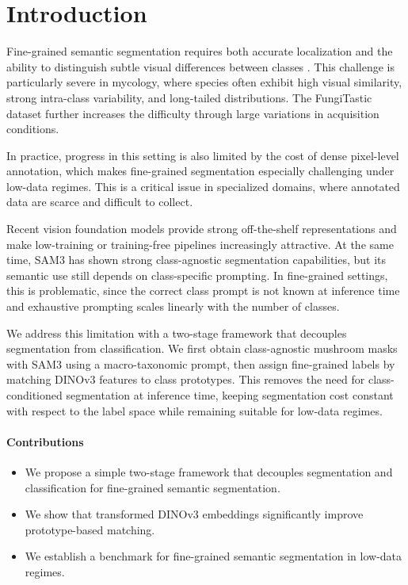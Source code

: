 \section{Introduction}

Fine-grained semantic segmentation requires both accurate localization and the ability to distinguish subtle visual differences between classes \cite{birdclef, plantclef}. This challenge is particularly severe in mycology, where species often exhibit high visual similarity, strong intra-class variability, and long-tailed distributions. The FungiTastic dataset \cite{Picek_2022_WACV} further increases the difficulty through large variations in acquisition conditions.

In practice, progress in this setting is also limited by the cost of dense pixel-level annotation, which makes fine-grained segmentation especially challenging under low-data regimes. This is a critical issue in specialized domains, where annotated data are scarce and difficult to collect.

Recent vision foundation models \cite{dinov2, clip, siglip} provide strong off-the-shelf representations and make low-training or training-free pipelines increasingly attractive. At the same time, SAM3 \cite{carion2025sam3segmentconcepts} has shown strong class-agnostic segmentation capabilities, but its semantic use still depends on class-specific prompting. In fine-grained settings, this is problematic, since the correct class prompt is not known at inference time and exhaustive prompting scales linearly with the number of classes.

We address this limitation with a two-stage framework that decouples segmentation from classification. We first obtain class-agnostic mushroom masks with SAM3 using a macro-taxonomic prompt, then assign fine-grained labels by matching DINOv3 \cite{simeoni2025dinov3} features to class prototypes. This removes the need for class-conditioned segmentation at inference time, keeping segmentation cost constant with respect to the label space while remaining suitable for low-data regimes.

\paragraph{Contributions}
\begin{itemize}
    \item We propose a simple two-stage framework that decouples segmentation and classification for fine-grained semantic segmentation.
    \item We show that transformed DINOv3 embeddings significantly improve prototype-based matching.
    \item We establish a benchmark for fine-grained semantic segmentation in low-data regimes.
\end{itemize}

